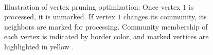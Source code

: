 \begin{figure}[hbtp]
  \centering
   \\[-2ex]
  \caption{Illustration of vertex pruning optimization: Once vertex $1$ is processed, it is unmarked. If vertex $1$ changes its community, its neighbors are marked for processing. Community membership of each vertex is indicated by border color, and marked vertices are highlighted in yellow \cite{sahu2023gvelouvain}.}
  \label{fig:rak-pruning}
\end{figure}
